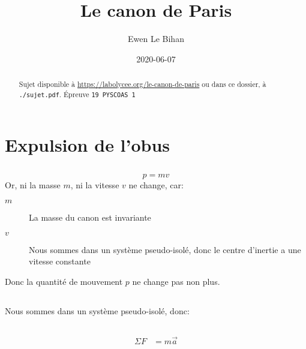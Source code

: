 \documentclass{article}
\title{Le canon de Paris}
\date{2020-06-07}
\author{Ewen Le Bihan}
\begin{document}
\maketitle
\begin{abstract}
	Sujet disponible à \url{https://labolycee.org/le-canon-de-paris} ou dans ce dossier, à \texttt{./sujet.pdf}. Épreuve \texttt{19 PYSCOAS 1}
\end{abstract}


\section{Expulsion de l'obus}
\subsection{}

\[
	p = mv 
\]
Or, ni la masse $m$, ni la vitesse $v$ ne change, car:
\begin{description}
	\item[$m$] La masse du canon est invariante
	\item[$v$] Nous sommes dans un système pseudo-isolé, donc le centre d'inertie a une vitesse constante
\end{description}

Donc la quantité de mouvement $p$ ne change pas non plus.
\subsection{}

Nous sommes dans un système pseudo-isolé, donc:

\subsection{}
\begin{align*}
	\Sigma F &= m\vec a \\
\end{align*}

\section{}

\subsection{}

\subsection{}
\end{document}
